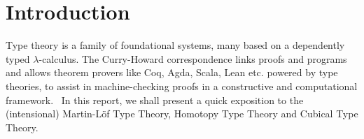 \section{Introduction}
Type theory is a family of foundational systems, many based on a dependently typed $\lambda$-calculus.
The Curry-Howard correspondence links proofs and programs and allows theorem provers like
Coq, Agda, Scala, Lean etc. powered by type theories, to assist in machine-checking proofs
in a constructive and computational framework.~\cite{howard1995formulae}
In this report, we shall present a quick exposition to the (intensional) Martin-L\"of Type Theory, Homotopy Type Theory and Cubical Type Theory.
